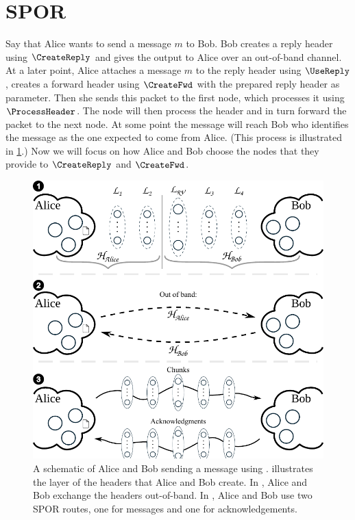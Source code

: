

\section{\Acf*{SPOR}}%
\label{SPOR}%
\label{sec:SPOR}%
\label{sec:message_passing}%

Say that Alice wants to send a message \(m\) to Bob.
Bob creates a reply header using \(\CreateReply\) and gives the output to Alice 
over an out-of-band channel.
At a later point, Alice attaches a message \(m\) to the reply header using 
\(\UseReply\), creates a forward header using \(\CreateFwd\) with the prepared 
reply header as parameter.  
Then she sends this packet to the first node, which processes it using 
\(\ProcessHeader\).
The node will then process the header and in turn forward the packet to the 
next node.
At some point the message will reach Bob who identifies the message as the 
one expected to come from Alice.
(This process is illustrated in \cref{fig:file-transfer}.)
Now we will focus on how Alice and Bob choose the nodes that they provide to 
\(\CreateReply\) and \(\CreateFwd\).

\begin{figure}
  \includegraphics[width=\linewidth]{figures/file_transfer_v2.pdf}
  \caption{\label{fig:file-transfer}%
    A schematic of Alice and Bob sending a message using \name.
     illustrates the layer of the headers that Alice and Bob create.
    In , Alice and Bob exchange the headers out-of-band.
    In , Alice and Bob use two \ac{SPOR} routes, one for messages and 
    one for acknowledgements.
  }
\end{figure}

